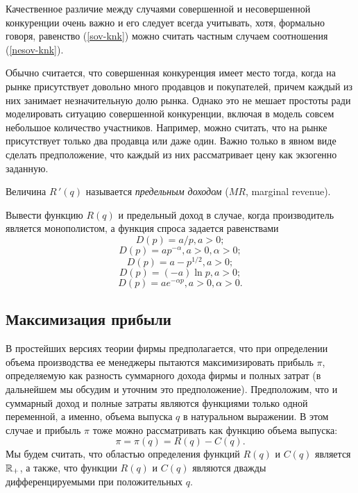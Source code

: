     Качественное различие между случаями совершенной и несовершенной
    конкуренции очень важно и его следует
    всегда учитывать, хотя, формально говоря, равенство (\ref{sov-knk})
    можно считать частным случаем соотношения (\ref{nesov-knk}).



    Обычно считается, что совершенная конкуренция имеет место тогда,
    когда на рынке присутствует довольно много продавцов и
    покупателей, причем каждый из них занимает незначительную долю
    рынка. Однако это не мешает простоты ради моделировать ситуацию
    совершенной  конкуренции, включая в модель совсем небольшое количество
    участников. Например, можно считать, что на рынке присутствует
    только два продавца или даже один. Важно только в явном виде сделать
    предположение, что каждый из них рассматривает цену как экзогенно заданную.







    Величина  $R\,'(q)$
    называется \emph{предельным доходом} ($MR$, marginal revenue).




\begin{exer}
Вывести функцию $R(q)$ и предельный доход в случае, когда
производитель является монополистом, а функция спроса задается
равенствами
    \[D(p)=a/p, a>0;\]
    \[D(p)=ap^{-\alpha} , a>0,  \alpha>0;\]
    \[D(p)=a-p^{1/2}, a>0;\]
    \[D(p)=(-a)\ln p, a>0;\]
    \[D(p)= ae^{-\alpha p}, a>0,  \alpha>0.\]
\end{exer}






\subsection {Максимизация прибыли}
    В простейших версиях теории фирмы предполагается, что при определении
    объема производства ее менеджеры
     пытаются максимизировать прибыль $\pi$, определяемую как  разность суммарного
      дохода фирмы и полных затрат (в дальнейшем мы обсудим и уточним это предположение).
     Предположим, что и суммарный доход и полные затраты являются
    функциями только одной переменной, а именно, объема выпуска
    $q$ в натуральном выражении.
    В этом случае и прибыль $\pi$ тоже можно рассматривать как  функцию объема
    выпуска:
    \[ \pi=\pi(q)=R(q)-C(q).\]
    Мы будем считать, что областью определения функций $R(q)$  и $C(q)$
    является $\mathbb{R}_{+}$, а также, что функции $R(q)$ и $C(q)$
    являются дважды дифференцируемыми при положительных $q$.

